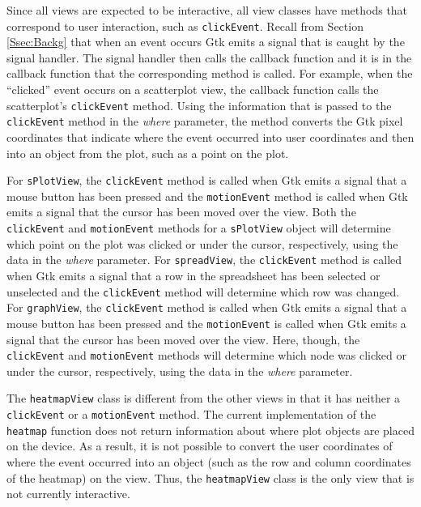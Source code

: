 \documentclass{article}[11pt]
\newcommand{\Rfunction}[1]{{\texttt{#1}}}
\newcommand{\Robject}[1]{{\texttt{#1}}}
\newcommand{\Rslot}[1]{\textsl{#1}}
\begin{document}
Since all views are expected to be interactive, all
view classes have methods that correspond to user interaction, such as
\Rfunction{clickEvent}.  Recall from Section \ref{Ssec:Backg} that when an
event occurs Gtk emits a signal that is caught by the signal handler.  The
signal handler then calls the callback function and it is in the callback
function that the corresponding method is called.  For example, when the
``clicked'' event occurs on a scatterplot view, the callback function calls the
scatterplot's \Rfunction{clickEvent} method.  Using the information that is
passed to the \Rfunction{clickEvent} method in the \Rslot{where} parameter,
the method converts the Gtk pixel coordinates that indicate where the event
occurred into user coordinates and then into an object from the plot, such as
a point on the plot. 

For \Robject{sPlotView}, the \Rfunction{clickEvent} method is called when Gtk
emits a signal that a mouse button has been pressed and the
\Rfunction{motionEvent} method is called when Gtk emits a signal that
the cursor has been moved over the view.  Both the \Rfunction{clickEvent} and
\Rfunction{motionEvent} methods for a \Robject{sPlotView} object will
determine which point on the plot was clicked or under the cursor,
respectively, using the data in the \Rslot{where} parameter.  For
\Robject{spreadView}, the \Rfunction{clickEvent} method is called when Gtk
emits a signal that a row in the spreadsheet has been selected or unselected
and the \Rfunction{clickEvent} method will determine which row was changed.
For \Robject{graphView}, the \Rfunction{clickEvent} method is called when Gtk
emits a signal that a mouse button has been pressed and the
\Rfunction{motionEvent} is called when Gtk emits a signal that the cursor has
been moved over the view.  Here, though, the \Rfunction{clickEvent} and
\Rfunction{motionEvent} methods will determine which node was clicked or under
the cursor, respectively, using the data in the \Rslot{where} parameter.  

The \Robject{heatmapView} class is different from the other views in that it
has neither a \Rfunction{clickEvent} or a \Rfunction{motionEvent} method.  The
current implementation of the \Rfunction{heatmap} function does not return
information about where plot objects are placed on the device.  As a result,
it is not possible to convert the user coordinates of where the event occurred
into an object (such as the row and column coordinates of the heatmap) on
the view.  Thus, the \Robject{heatmapView} class is the only view that is not
currently interactive.  
\end{document}
